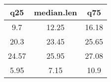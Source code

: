 \documentclass[]{article}
\begin{document}
\begin{longtable}[c]{@{}ccc@{}}
\toprule
\begin{minipage}[b]{0.08\columnwidth}\centering\strut
q25
\strut\end{minipage} &
\begin{minipage}[b]{0.16\columnwidth}\centering\strut
median.len
\strut\end{minipage} &
\begin{minipage}[b]{0.06\columnwidth}\centering\strut
q75
\strut\end{minipage}\tabularnewline
\midrule
\endhead
\begin{minipage}[t]{0.08\columnwidth}\centering\strut
9.7
\strut\end{minipage} &
\begin{minipage}[t]{0.16\columnwidth}\centering\strut
12.25
\strut\end{minipage} &
\begin{minipage}[t]{0.06\columnwidth}\centering\strut
16.18
\strut\end{minipage}\tabularnewline
\begin{minipage}[t]{0.08\columnwidth}\centering\strut
20.3
\strut\end{minipage} &
\begin{minipage}[t]{0.16\columnwidth}\centering\strut
23.45
\strut\end{minipage} &
\begin{minipage}[t]{0.06\columnwidth}\centering\strut
25.65
\strut\end{minipage}\tabularnewline
\begin{minipage}[t]{0.08\columnwidth}\centering\strut
24.57
\strut\end{minipage} &
\begin{minipage}[t]{0.16\columnwidth}\centering\strut
25.95
\strut\end{minipage} &
\begin{minipage}[t]{0.06\columnwidth}\centering\strut
27.08
\strut\end{minipage}\tabularnewline
\begin{minipage}[t]{0.08\columnwidth}\centering\strut
5.95
\strut\end{minipage} &
\begin{minipage}[t]{0.16\columnwidth}\centering\strut
7.15
\strut\end{minipage} &
\begin{minipage}[t]{0.06\columnwidth}\centering\strut
10.9
\strut\end{minipage}\tabularnewline

\end{longtable}
\end{document}

